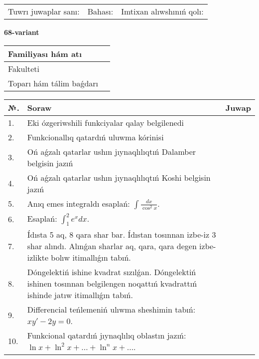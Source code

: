 \documentclass{article}
\begin{document}
\vspace{1cm}

\begin{tabular}{ c c c }
Tuwrı juwaplar sanı: \underline{\hspace{2cm}} & Bahası: \underline{\hspace{2cm}} & Imtixan alıwshınıń qolı: \underline{\hspace{2cm}} \\
\end{tabular}

\newpage

\begin{center}\textbf{68-variant}\end{center}

\bgroup
\def\arraystretch{1.5}
\begin{tabular}{ |m{6cm}|m{10cm}| }
  \hline
  Familiyası hám atı & \\
  \hline
  Fakulteti &\\
  \hline
  Toparı hám tálim baǵdarı & \\
  \hline
\end{tabular}
\egroup

\vspace{0.5cm}

\bgroup
\def\arraystretch{2}
\begin{tabular}{ |l|m{8cm}|m{7cm}| }
  \hline
  №. & Soraw & Juwap \\
  \hline
  1. & Eki ózgeriwshili funkciyalar qalay belgilenedi &  \\
  \hline
  2. & Funkcionallıq qatardıń uluwma kórinisi &  \\
  \hline
  3. & Oń aǵzalı qatarlar ushın jıynaqlılıqtıń Dalamber belgisin jazıń &  \\
  \hline
  4. & Oń aǵzalı qatarlar ushın jıynaqlılıqtıń Koshi belgisin jazıń &  \\
  \hline
  5. & Anıq emes integraldı esaplań: $\displaystyle\int \frac{dx}{\cos^{2}x}$. &  \\
  \hline
  6. & Esaplań: $\displaystyle\int_{1}^{2}{e^{x}dx}$. &  \\
  \hline
  7. & Ídısta 5 aq, 8 qara shar bar. Ídıstan tosınnan izbe-iz 3 shar alındı. Alınǵan sharlar aq, qara, qara degen izbe-izlikte bolıw itimallıǵın tabıń. &  \\
  \hline
  8. & Dóngelektiń ishine kvadrat sızılǵan. Dóngelektiń ishinen tosınnan belgilengen noqattıń kvadrattıń ishinde jatıw itimallıǵın tabıń. &  \\
  \hline
  9. & Differencial teńlemeniń ulıwma sheshimin tabıń: $xy' - 2y = 0$. &  \\
  \hline
  10. & Funkcional qatardıń jıynaqlılıq oblastın jazıń: $\ln x + \ln^{2}x + \ldots + \ln^{n}x + \ldots$. &  \\
  \hline
\end{tabular}
\egroup
\end{document}
